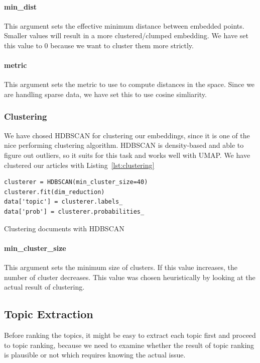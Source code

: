 \documentclass[sigconf,authorversion,nonacm]{acmart}
\begin{document}
\paragraph{min\_dist}
This argument sets the effective minimum distance between embedded points.
Smaller values will result in a more clustered/clumped embedding.
We have set this value to 0 because we want to cluster them more strictly.

\paragraph{metric}
This argument sets the metric to use to compute distances in the space.
Since we are handling sparse data, we have set this to use cosine simliarity.

\subsubsection{Clustering}
We have chosed HDBSCAN for clustering our embeddings, since it is one of the
nice performing clustering algorithm. HDBSCAN is density-based and able to
figure out outliers, so it suits for this task and works well with UMAP.
We have clustered our articles with Listing~\ref{lst:clustering}


\begin{listing}[ht]
\begin{verbatim}
clusterer = HDBSCAN(min_cluster_size=40)
clusterer.fit(dim_reduction)
data['topic'] = clusterer.labels_
data['prob'] = clusterer.probabilities_
\end{verbatim}
\caption{Clustering documents with HDBSCAN}
\label{lst:clustering}
\end{listing}

\paragraph{min\_cluster\_size}
This argument sets the minimum size of clusters. If this value increases,
the number of cluster decreases. This value was chosen heuristically by looking at
the actual result of clustering.

\subsection{Topic Extraction}
Before ranking the topics, it might be easy to extract each topic first
and proceed to topic ranking, because we need to examine whether
the result of topic ranking is plausible or not which requires knowing the
actual issue.
\end{document}
